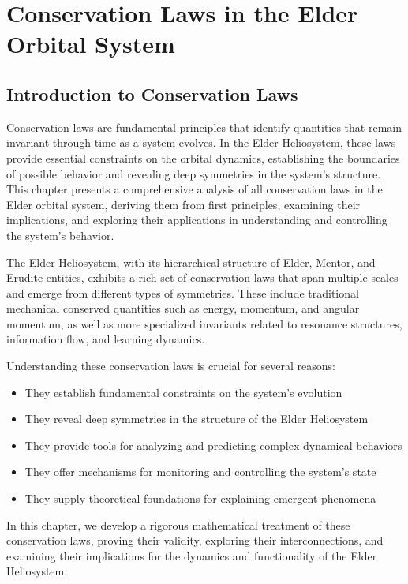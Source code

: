 \chapter{Conservation Laws in the Elder Orbital System}

\section{Introduction to Conservation Laws}

Conservation laws are fundamental principles that identify quantities that remain invariant through time as a system evolves. In the Elder Heliosystem, these laws provide essential constraints on the orbital dynamics, establishing the boundaries of possible behavior and revealing deep symmetries in the system's structure. This chapter presents a comprehensive analysis of all conservation laws in the Elder orbital system, deriving them from first principles, examining their implications, and exploring their applications in understanding and controlling the system's behavior.

The Elder Heliosystem, with its hierarchical structure of Elder, Mentor, and Erudite entities, exhibits a rich set of conservation laws that span multiple scales and emerge from different types of symmetries. These include traditional mechanical conserved quantities such as energy, momentum, and angular momentum, as well as more specialized invariants related to resonance structures, information flow, and learning dynamics.

Understanding these conservation laws is crucial for several reasons:

\begin{itemize}
    \item They establish fundamental constraints on the system's evolution
    \item They reveal deep symmetries in the structure of the Elder Heliosystem
    \item They provide tools for analyzing and predicting complex dynamical behaviors
    \item They offer mechanisms for monitoring and controlling the system's state
    \item They supply theoretical foundations for explaining emergent phenomena
\end{itemize}

In this chapter, we develop a rigorous mathematical treatment of these conservation laws, proving their validity, exploring their interconnections, and examining their implications for the dynamics and functionality of the Elder Heliosystem.

